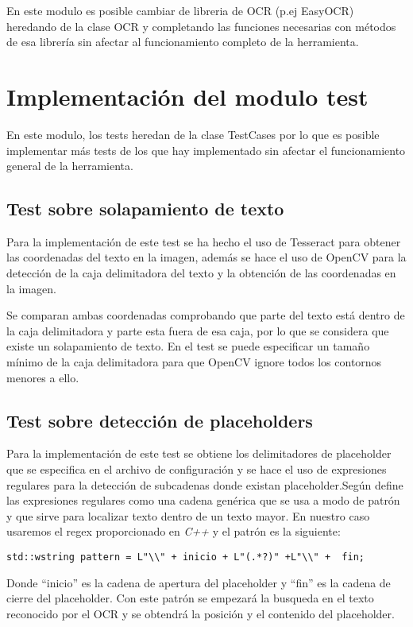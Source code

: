 En este modulo es posible cambiar de libreria de OCR (p.ej EasyOCR) heredando de la clase OCR y completando las funciones necesarias con métodos de esa librería sin afectar al funcionamiento completo de la herramienta. 
\section{Implementación del modulo test}
\label{sec:Implementación de los tests}

En este modulo, los tests heredan de la clase TestCases por lo que es posible implementar más tests de los que hay implementado sin afectar el funcionamiento general de la herramienta.
\subsection{Test sobre solapamiento de texto}
Para la implementación de este test se ha hecho el uso de Tesseract para obtener las coordenadas del texto en la imagen, además se hace el uso de OpenCV para la detección de la caja delimitadora del texto y la obtención de las coordenadas en la imagen.

Se comparan ambas coordenadas comprobando que parte del texto está dentro de la caja delimitadora y parte esta fuera de esa caja, por lo que se considera que existe un solapamiento de texto. En el test se puede especificar un tamaño mínimo de la caja delimitadora para que OpenCV ignore todos los contornos menores a ello. 
\subsection{Test sobre detección de placeholders}
Para la implementación de este test se obtiene los delimitadores de placeholder que se especifica en el archivo de configuración y se hace el uso de expresiones regulares para la detección de subcadenas donde existan placeholder.Según \cite{Regex} define las expresiones regulares como una cadena genérica que se usa a modo de patrón y que sirve para localizar texto dentro de un texto mayor. En nuestro caso usaremos el regex proporcionado en \emph{C++} y el patrón es la siguiente:

\verb|std::wstring pattern = L"\\" + inicio + L"(.*?)" +L"\\" +  fin;|

Donde ``inicio'' es la cadena de apertura del placeholder y ``fin'' es la cadena de cierre del placeholder. 
Con este patrón se empezará la busqueda en el texto reconocido por el OCR y se obtendrá la posición y el contenido del placeholder.


